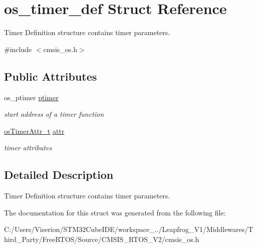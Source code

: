 \hypertarget{structos__timer__def}{}\section{os\+\_\+timer\+\_\+def Struct Reference}
\label{structos__timer__def}


Timer Definition structure contains timer parameters.  




{\ttfamily \#include $<$cmsis\+\_\+os.\+h$>$}

\subsection*{Public Attributes}
\begin{DoxyCompactItemize}
\item 
\mbox{\label{structos__timer__def_a7e7df6a1b8c1a1149a19d8c7f19cfe05}} 
os\+\_\+ptimer \mbox{\hyperlink{structos__timer__def_a7e7df6a1b8c1a1149a19d8c7f19cfe05}{ptimer}}
\begin{DoxyCompactList}\small\item\em start address of a timer function \end{DoxyCompactList}\item 
\mbox{\label{structos__timer__def_a0afac212a781b48c016b9bfa471699d0}} 
\mbox{\hyperlink{structos_timer_attr__t}{os\+Timer\+Attr\+\_\+t}} \mbox{\hyperlink{structos__timer__def_a0afac212a781b48c016b9bfa471699d0}{attr}}
\begin{DoxyCompactList}\small\item\em timer attributes \end{DoxyCompactList}\end{DoxyCompactItemize}


\subsection{Detailed Description}
Timer Definition structure contains timer parameters. 

The documentation for this struct was generated from the following file\+:\begin{DoxyCompactItemize}
\item 
C\+:/\+Users/\+Viserion/\+S\+T\+M32\+Cube\+I\+D\+E/workspace\+\_../\+Leapfrog\+\_\+\+V1/\+Middlewares/\+Third\+\_\+\+Party/\+Free\+R\+T\+O\+S/\+Source/\+C\+M\+S\+I\+S\+\_\+\+R\+T\+O\+S\+\_\+\+V2/cmsis\+\_\+os.\+h\end{DoxyCompactItemize}
